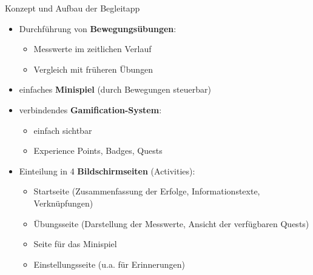\documentclass[final,20pt]{beamer}
\newlength{\colwidth}
\begin{document}
\begin{frame}[t]
\begin{columns}[t]
\begin{column}{\colwidth}
	\begin{alertblock}{Konzept und Aufbau der Begleitapp}
		\begin{itemize}
			\item Durchführung von \textbf{Bewegungsübungen}:
			\begin{itemize}
				\item Messwerte im zeitlichen Verlauf
				\item Vergleich mit früheren Übungen
			\end{itemize}
			\item einfaches \textbf{Minispiel} (durch Bewegungen steuerbar)
			\item verbindendes \textbf{Gamification-System}:
			\begin{itemize}
				\item einfach sichtbar
				\item Experience Points, Badges, Quests
			\end{itemize}
			\item Einteilung in 4 \textbf{Bildschirmseiten} (Activities):
			\begin{itemize}
				\item Startseite (Zusammenfassung der Erfolge, Informationstexte, Verknüpfungen)
				\item Übungsseite (Darstellung der Messwerte, Ansicht der verfügbaren Quests)
				\item Seite für das Minispiel
				\item Einstellungsseite (u.a. für Erinnerungen)
			\end{itemize}
		\end{itemize}
	\end{alertblock}


\end{column}
\end{columns}
\end{frame}
\end{document}
